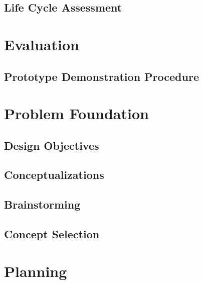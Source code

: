 \documentclass{article}
\begin{document}
\subsection{Life Cycle Assessment}







\section{Evaluation} \label{eval}
\subsection{Prototype Demonstration Procedure}


\newpage
\appendix
\appendixpage

\section{Problem Foundation}
\subsection{Design Objectives}


\subsection{Conceptualizations}

\subsection{Brainstorming}

\subsection{Concept Selection}


\section{Planning}

\end{document}
